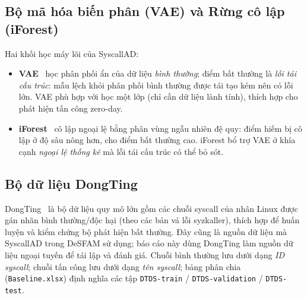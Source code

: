 \subsection{Bộ mã hóa biến phân (VAE) và Rừng cô lập (iForest)}
Hai khối học máy lõi của SyscallAD:
\begin{itemize}[leftmargin=1.6em]
  \item \textbf{VAE}~\cite{vae_kingma} học phân phối ẩn của dữ liệu \emph{bình
        thường}; điểm bất thường là \emph{lỗi tái cấu trúc}: mẫu lệch khỏi phân phối
        bình thường được tái tạo kém nên có lỗi lớn. VAE phù hợp với học một lớp
        (chỉ cần dữ liệu lành tính), thích hợp cho phát hiện tấn công zero-day.
  \item \textbf{iForest}~\cite{iforest_liu} cô lập ngoại lệ bằng phân vùng ngẫu
        nhiên đệ quy: điểm hiếm bị cô lập ở độ sâu nông hơn, cho điểm bất thường cao.
        iForest bổ trợ VAE ở khía cạnh \emph{ngoại lệ thống kê} mà lỗi tái cấu trúc
        có thể bỏ sót.
\end{itemize}

\subsection{Bộ dữ liệu DongTing}
DongTing~\cite{ref26_dongtingdataset} là bộ dữ liệu quy mô lớn gồm các chuỗi syscall
của nhân Linux được gán nhãn bình thường/độc hại (theo các bản vá lỗi syzkaller),
thích hợp để huấn luyện và kiểm chứng bộ phát hiện bất thường. Đây cũng là nguồn dữ
liệu mà SyscallAD trong DeSFAM sử dụng; báo cáo này dùng DongTing làm nguồn dữ liệu
ngoại tuyến để tái lập và đánh giá. Chuỗi bình thường lưu dưới dạng \emph{ID
syscall}; chuỗi tấn công lưu dưới dạng \emph{tên syscall}; bảng phân chia
(\texttt{Baseline.xlsx}) định nghĩa các tập \texttt{DTDS-train} /
\texttt{DTDS-validation} / \texttt{DTDS-test}.

